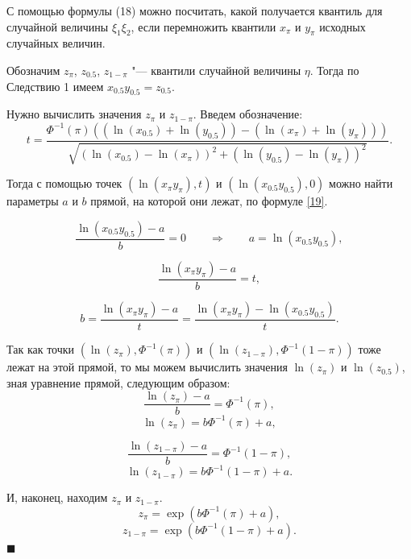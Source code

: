 \documentclass[12pt]{article}
\newenvironment{Proof}{\par\noindent{\bf Доказательство.}}{\hfill$\scriptstyle\blacksquare$}
\begin{document}
	\begin{Proof}
		С помощью формулы (18) можно посчитать, какой получается квантиль для случайной величины $\xi_{1}\xi_{2}$, если перемножить квантили $x_{\pi}$ и $y_{\pi}$ исходных случайных величин.
		
		Обозначим $z_{\pi}$, $z_{0.5}$, $z_{1-\pi}$ "--- квантили случайной величины $\eta$.
		Тогда по Следствию 1 имеем $x_{0.5}y_{0.5} = z_{0.5}$.
		
		Нужно вычислить значения $z_{\pi}$ и $z_{1-\pi}$. Введем обозначение:
		\begin{equation*}
			t = \frac{\Phi^{-1}(\pi)((\ln(x_{0.5})+\ln(y_{0.5}))-(\ln(x_{\pi})+\ln(y_{\pi})))}{\sqrt{(\ln(x_{0.5})-\ln(x_{\pi}))^{2}+(\ln(y_{0.5})-\ln(y_{\pi}))^{2}}}. 
		\end{equation*}
		
		Тогда с помощью точек $(\ln(x_{\pi}y_{\pi}), t)$ и $(\ln(x_{0.5}y_{0.5}),0)$  можно найти параметры $a$ и $b$ прямой, на которой они лежат, по формуле \eqref{19}.
		
		\begin{equation*}
			\dfrac{\ln(x_{0.5}y_{0.5})-a}{b}=0 \quad\quad \Rightarrow \quad\quad a=\ln(x_{0.5}y_{0.5}),
		\end{equation*}
		
		\begin{equation*}
			\dfrac{\ln(x_{\pi}y_{\pi})-a}{b}=t,
		\end{equation*}
		
		\begin{equation*}
			b=\dfrac{\ln(x_{\pi}y_{\pi})-a}{t}=\dfrac{\ln(x_{\pi}y_{\pi})-\ln(x_{0.5}y_{0.5})}{t}.
		\end{equation*}
		
		Так как точки $(\ln(z_{\pi}), \Phi^{-1}(\pi))$ и $(\ln(z_{1-\pi}), \Phi^{-1}(1-\pi))$ тоже лежат на этой прямой, то мы можем вычислить значения $\ln(z_{\pi})$ и $\ln(z_{0.5})$, зная уравнение прямой, следующим образом:
		\begin{equation*}
			\dfrac{\ln(z_{\pi})-a}{b}=\Phi^{-1}(\pi),
		\end{equation*}
		\begin{equation*}
			\ln(z_{\pi})=b\Phi^{-1}(\pi)+a,
		\end{equation*}
		
		\begin{equation*}
			\dfrac{\ln(z_{1-\pi})-a}{b}=\Phi^{-1}(1-\pi),
		\end{equation*}
		\begin{equation*}
			\ln(z_{1-\pi})=b\Phi^{-1}(1-\pi)+a.
		\end{equation*}
		
		И, наконец, находим $z_{\pi}$ и $z_{1-\pi}$.
		\begin{equation*}
			z_{\pi}=\exp(b\Phi^{-1}(\pi)+a),
		\end{equation*}
		\begin{equation*}
			z_{1-\pi}=\exp(b\Phi^{-1}(1-\pi)+a).
		\end{equation*}
	\end{Proof}
	
\end{document}
